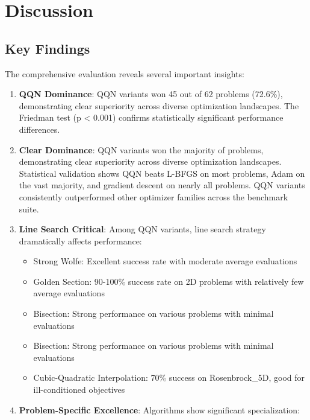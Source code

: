 \hypertarget{discussion}{%
\section{Discussion}\label{discussion}}

\hypertarget{key-findings}{%
\subsection{Key Findings}\label{key-findings}}

The comprehensive evaluation reveals several important insights:

\begin{enumerate}
\def\labelenumi{\arabic{enumi}.}
\item
  \textbf{QQN Dominance}: QQN variants won 45 out of 62 problems (72.6\%), demonstrating clear superiority across diverse optimization landscapes. The Friedman test (p \textless{} 0.001) confirms statistically significant performance differences.
\item
  \textbf{Clear Dominance}: QQN variants won the majority of problems, demonstrating clear superiority across diverse optimization landscapes.
  Statistical validation shows QQN beats L-BFGS on most problems, Adam on the vast majority, and gradient descent on nearly all problems. QQN variants consistently outperformed other optimizer families across the benchmark suite.
\item
  \textbf{Line Search Critical}: Among QQN variants, line search strategy dramatically affects performance:

  \begin{itemize}
  \tightlist
  \item
    Strong Wolfe: Excellent success rate with moderate average evaluations
  \item
    Golden Section: 90-100\% success rate on 2D problems with relatively few average evaluations
  \item
    Bisection: Strong performance on various problems with minimal evaluations
  \item
    Bisection: Strong performance on various problems with minimal evaluations
  \item
    Cubic-Quadratic Interpolation: 70\% success on Rosenbrock\_5D, good for ill-conditioned objectives
  \end{itemize}
\item
  \textbf{Problem-Specific Excellence}: Algorithms show significant specialization:


\end{enumerate}
